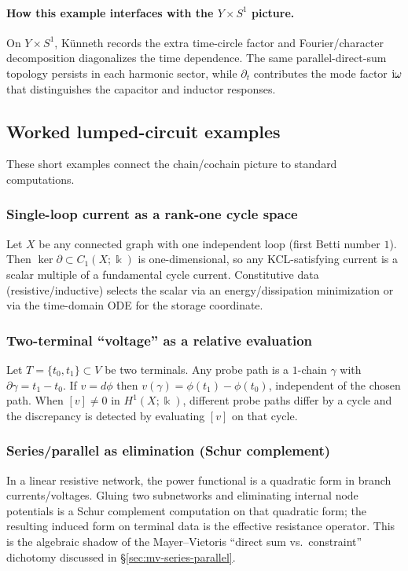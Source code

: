 \documentclass[11pt]{article}
\begin{document}
\paragraph{How this example interfaces with the \texorpdfstring{$Y\times S^1$}{YxS1} picture.}
On $Y\times S^1$, K\"unneth records the extra time-circle factor and Fourier/character decomposition diagonalizes the time dependence.
The same parallel-direct-sum topology persists in each harmonic sector, while $\partial_t$ contributes the mode factor $\mathrm{i}\omega$ that distinguishes the capacitor and inductor responses.

\subsection{Worked lumped-circuit examples}
\label{sec:lumped-examples}
These short examples connect the chain/cochain picture to standard computations.

\subsubsection{Single-loop current as a rank-one cycle space}
Let $X$ be any connected graph with one independent loop (first Betti number $1$).
Then $\ker\partial\subset C_1(X;\Bbbk)$ is one-dimensional, so any KCL-satisfying current is a scalar multiple of a fundamental cycle current.
Constitutive data (resistive/inductive) selects the scalar via an energy/dissipation minimization or via the time-domain ODE for the storage coordinate.

\subsubsection{Two-terminal ``voltage'' as a relative evaluation}
Let $T=\{t_0,t_1\}\subset V$ be two terminals.
Any probe path is a $1$-chain $\gamma$ with $\partial\gamma=t_1-t_0$.
If $v=d\phi$ then $v(\gamma)=\phi(t_1)-\phi(t_0)$, independent of the chosen path.
When $[v]\neq 0$ in $H^1(X;\Bbbk)$, different probe paths differ by a cycle and the discrepancy is detected by evaluating $[v]$ on that cycle.

\subsubsection{Series/parallel as elimination (Schur complement)}
In a linear resistive network, the power functional is a quadratic form in branch currents/voltages.
Gluing two subnetworks and eliminating internal node potentials is a Schur complement computation on that quadratic form; the resulting induced form on terminal data is the effective resistance operator.
This is the algebraic shadow of the Mayer--Vietoris ``direct sum vs.\ constraint'' dichotomy discussed in \S\ref{sec:mv-series-parallel}.
\end{document}

